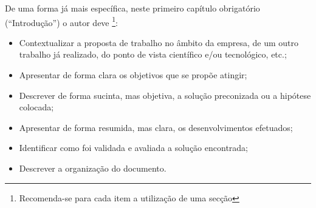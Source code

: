 De uma forma já mais específica, neste primeiro capítulo obrigatório (``Introdução'') o autor deve \footnote{Recomenda-se para cada item a utilização de uma secção}:
\begin{itemize}
	\item Contextualizar a proposta de trabalho no âmbito da empresa, de um outro trabalho já realizado, do ponto de vista científico e/ou tecnológico, etc.;
	\item Apresentar de forma clara os objetivos que se propõe atingir;
	\item Descrever de forma sucinta, mas objetiva, a solução preconizada ou a hipótese colocada;
	\item Apresentar de forma resumida, mas clara, os desenvolvimentos efetuados;
	\item Identificar como foi validada e avaliada a solução encontrada;
	\item Descrever a organização do documento.
\end{itemize}
